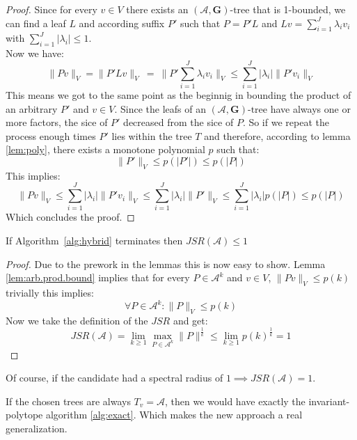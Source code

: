 \begin{proof}
  Since for every $v \in V$ there exists an $(\mathcal{A},\mathbf{G})\text{-tree}$ that is 1-bounded, we can find a leaf $L$ and according suffix $P'$ such that $P = P'L$ and $Lv = \sum _{i=1}^{J} \lambda _{i} v_{i}$ with $\sum _{i=1}^{J} |\lambda _{i} |\leq 1$. \\
  Now we have: 
  \begin{equation*}
  \| Pv\| _{V} =\| P'Lv\| _{V} \ =\ \| P'\sum _{i=1}^{J} \lambda _{i} v_{i} \| _{V} \leq \sum _{i=1}^{J} |\lambda _{i} |\| P'v_{i} \| _{V}
  \end{equation*}
  This means we got to the same point as the beginnig in bounding the product of an arbitrary $P'$ and $v \in V$. Since the leafs of an $(\mathcal{A},\mathbf{G})\text{-tree}$ have always one or more factors, the sice of $P'$ decreased from the sice of $P$. So if we repeat the process enough times $P'$ lies within the tree $T$ and therefore, according to lemma \ref{lem:poly}, there exists a monotone polynomial $p$ such that: $$\|P'\| _{V} \leq p(|P'|) \leq p(|P|)$$
  This implies:
  \begin{equation*}
  \| Pv\| _{V} \leq \sum _{i=1}^{J} |\lambda _{i} |\| P'v_{i} \| _{V} \leq \sum _{i=1}^{J} |\lambda _{i} |\| P'\| _{V} \leq \sum _{i=1}^{J} |\lambda _{i} |p( |P|) \leq p( |P|)
  \end{equation*}
  Which concludes the proof.
\end{proof}

\begin{theorem}{}\label{thm:hybrid-found}
If Algorithm~\ref{alg:hybrid} terminates then $JSR(\mathcal{A}) \leq 1$
\end{theorem}

\begin{proof}
  Due to the prework in the lemmas this is now easy to show. 
  Lemma \ref{lem:arb.prod.bound} implies that for every $P \in \mathcal{A}^k$ and $v \in V$, $\lVert Pv \rVert _V \le p(k)$
  trivially this implies: 
  $$
    \forall P \in \mathcal{A}^k: \lVert P \rVert _V \le p(k)
  $$
  Now we take the definition of the $JSR$ and get:
  $$
    JSR(\mathcal{A}) = \lim_{k \geq 1} \max_{P \in \mathcal{A}^k} \lVert P \rVert^\frac{1}{k} \le \lim_{k \geq 1} p(k)^\frac{1}{k} = 1
  $$ 
\end{proof}

Of course, if the candidate had a spectral radius of $1 \implies JSR(\mathcal{A}) = 1$.

\begin{corollary}
  If the chosen trees are always $T_v = \mathcal{A}$, then we would have exactly the invariant-polytope algorithm \ref{alg:exact}. 
  Which makes the new approach a real generalization. 
\end{corollary}

